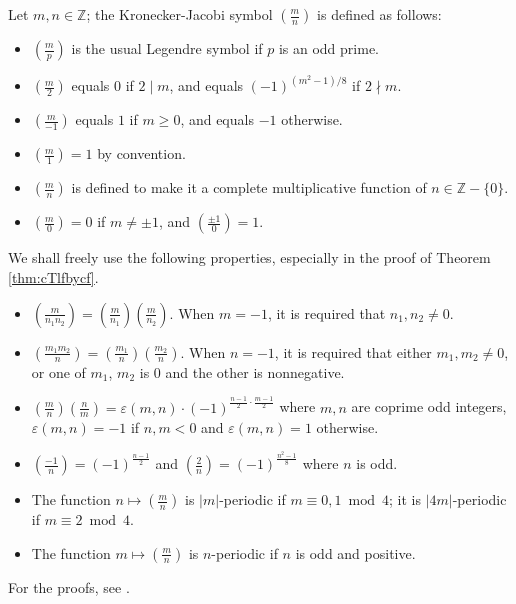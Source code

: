 \documentclass[12pt]{amsart}
\numberwithin{equation}{section}
\theoremstyle{plain}
\theoremstyle{definition}
\theoremstyle{remark}
\newcommand\legendre[2]{\genfrac{(}{)}{}{}{#1}{#2}}
\newcommand*\abs[1]{\lvert#1\rvert}
\newcommand\numZ{\mathbb{Z}}
\begin{document}
Let $m,n\in\numZ$; the Kronecker-Jacobi symbol $\legendre{m}{n}$ is defined as follows:
\begin{itemize}
\item $\legendre{m}{p}$ is the usual Legendre symbol if $p$ is an odd prime.
\item $\legendre{m}{2}$ equals $0$ if $2 \mid m$, and equals $(-1)^{(m^2-1)/8}$ if $2 \nmid m$.
\item $\legendre{m}{-1}$ equals $1$ if $m \geq 0$, and equals $-1$ otherwise.
\item $\legendre{m}{1}=1$ by convention.
\item $\legendre{m}{n}$ is defined to make it a complete multiplicative function of $n \in \numZ-\{0\}$.
\item $\legendre{m}{0}=0$ if $m \neq \pm1$, and $\legendre{\pm1}{0}=1$.
\end{itemize}
We shall freely use the following properties, especially in the proof of Theorem \ref{thm:cTlfbycf}.
\begin{itemize}
\item $\legendre{m}{n_1n_2}=\legendre{m}{n_1}\legendre{m}{n_2}$. When $m=-1$, it is required that $n_1,n_2\neq0$.
\item $\legendre{m_1m_2}{n}=\legendre{m_1}{n}\legendre{m_2}{n}$. When $n=-1$, it is required that either $m_1,m_2\neq0$, or one of $m_1$, $m_2$ is $0$ and the other is nonnegative.
\item $\legendre{m}{n}\legendre{n}{m}=\varepsilon(m,n)\cdot(-1)^{\frac{n-1}{2}\cdot\frac{m-1}{2}}$ where $m,n$ are coprime odd integers, $\varepsilon(m,n)=-1$ if $n,m<0$ and $\varepsilon(m,n)=1$ otherwise.
\item $\legendre{-1}{n}=(-1)^{\frac{n-1}{2}}$ and $\legendre{2}{n}=(-1)^{\frac{n^2-1}{8}}$ where $n$ is odd.
\item The function $n\mapsto\legendre{m}{n}$ is $\abs{m}$-periodic if $m\equiv0,1\bmod{4}$; it is $\abs{4m}$-periodic if $m\equiv2\bmod{4}$.
\item The function $m\mapsto\legendre{m}{n}$ is $n$-periodic if $n$ is odd and positive.
\end{itemize}
For the proofs, see \cite[Section 2.2.2]{Coh07}.
\end{document}
